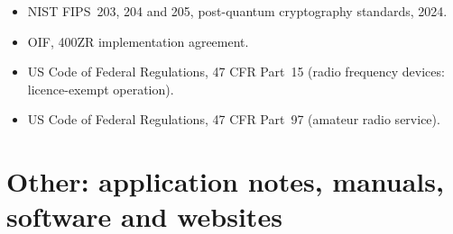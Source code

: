 \begin{itemize}[leftmargin=1.5em,itemindent=-1.5em,itemsep=1.5pt plus 1pt,parsep=0pt,topsep=4pt,label={}]
\item NIST FIPS~203, 204 and 205, post-quantum cryptography standards, 2024.
\item OIF, 400ZR implementation agreement.
\item US Code of Federal Regulations, 47 CFR Part~15 (radio frequency devices: licence-exempt operation).
\item US Code of Federal Regulations, 47 CFR Part~97 (amateur radio service).
\end{itemize}
\endgroup

\section*{Other: application notes, manuals, software and websites}
\begingroup\small
